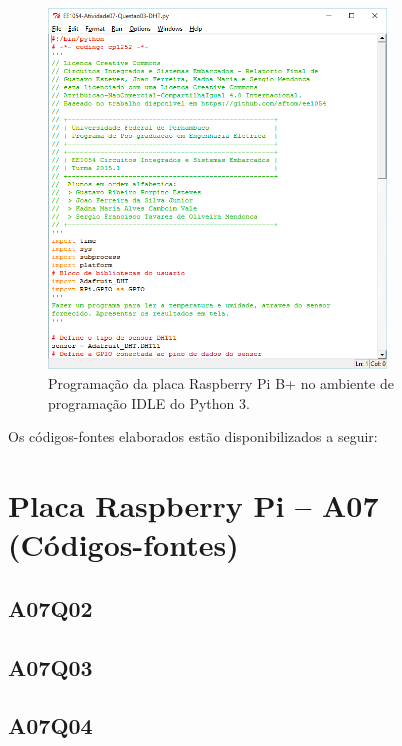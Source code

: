 \documentclass[
	12pt,				%
	openright,			%
  oneside,     %
	a4paper,			%
	english,			%
	french,				%
	spanish,			%
	brazil				%
	]{abntex2}
\begin{document}
\begin{figure}[ht]
  \centering
  \caption{\label{fig:cha-7-idle}Programação da placa Raspberry Pi B+ no ambiente de programação IDLE do Python 3.}
  \includegraphics[width=0.8\textwidth]{images/Atividade07/IDLE.png}
\end{figure}


\newpage
Os códigos-fontes elaborados estão disponibilizados a seguir:
\section*{Placa Raspberry Pi -- A07 (Códigos-fontes)}
\label{sec:RaspberryPi-A07Q02}
\subsection*{A07Q02}



\subsection*{A07Q03}



\subsection*{A07Q04}

\end{document}
